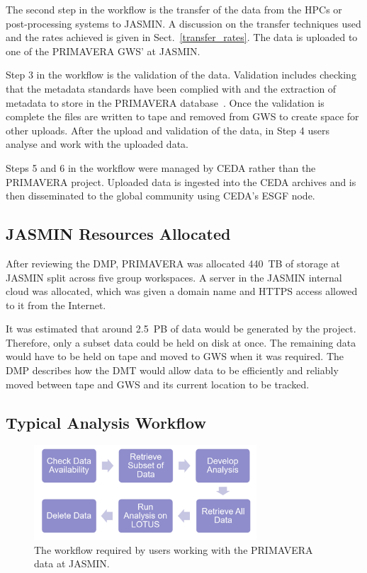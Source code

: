 \documentclass[gmd, manuscript]{copernicus}
\begin{document}
The second step in the workflow is the transfer of the data from the HPCs or post-processing systems to JASMIN. A discussion on the transfer techniques used and the rates achieved is given in Sect.~\ref{transfer_rates}. The data is uploaded to one of the PRIMAVERA GWS' at JASMIN.

Step 3 in the workflow is the validation of the data. Validation includes checking that the metadata standards have been complied with and the extraction of metadata to store in the PRIMAVERA database~\citep{Seddon2020}. Once the validation is complete the files are written to tape and removed from GWS to create space for other uploads. After the upload and validation of the data, in Step 4 users analyse and work with the uploaded data. 

Steps 5 and 6 in the workflow were managed by CEDA rather than the PRIMAVERA project. Uploaded data is ingested into the CEDA archives and is then disseminated to the global community using CEDA's ESGF node.


\subsection{JASMIN Resources Allocated}

After reviewing the DMP, PRIMAVERA was allocated 440~TB of storage at JASMIN split across  five group workspaces. A server in the JASMIN internal cloud was allocated, which was given a domain name and  HTTPS access allowed to it from the Internet.

It was estimated that around 2.5~PB of data would be generated by the project. Therefore, only a subset data could be held on disk at once. The remaining data would have to be held on tape and moved to GWS when it was required. The DMP describes how the DMT would allow data to be efficiently and reliably moved between tape and GWS and its current location to be tracked.

\subsection{Typical Analysis Workflow}

\begin{figure}[t]
	\includegraphics[width=8.3cm]{fig02.png}
	\caption{The workflow required by users working with the PRIMAVERA data at JASMIN.}
	\label{analysis_workflow}
\end{figure}
\end{document}
